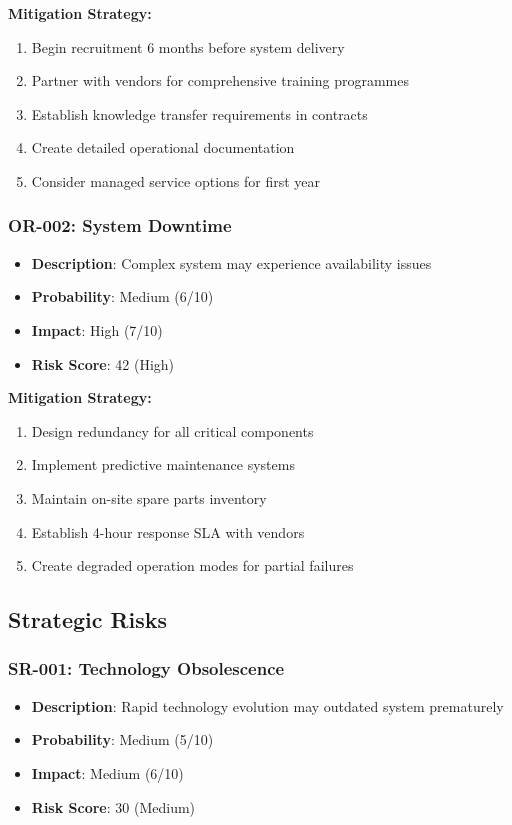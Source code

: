 \textbf{Mitigation Strategy:}
\begin{enumerate}
\item Begin recruitment 6 months before system delivery
\item Partner with vendors for comprehensive training programmes
\item Establish knowledge transfer requirements in contracts
\item Create detailed operational documentation
\item Consider managed service options for first year
\end{enumerate}

\subsubsection{OR-002: System Downtime}
\begin{itemize}
\item \textbf{Description}: Complex system may experience availability issues
\item \textbf{Probability}: Medium (6/10)
\item \textbf{Impact}: High (7/10)
\item \textbf{Risk Score}: 42 (High)
\end{itemize}

\textbf{Mitigation Strategy:}
\begin{enumerate}
\item Design redundancy for all critical components
\item Implement predictive maintenance systems
\item Maintain on-site spare parts inventory
\item Establish 4-hour response SLA with vendors
\item Create degraded operation modes for partial failures
\end{enumerate}

\subsection{Strategic Risks}

\subsubsection{SR-001: Technology Obsolescence}
\begin{itemize}
\item \textbf{Description}: Rapid technology evolution may outdated system prematurely
\item \textbf{Probability}: Medium (5/10)
\item \textbf{Impact}: Medium (6/10)
\item \textbf{Risk Score}: 30 (Medium)
\end{itemize}


